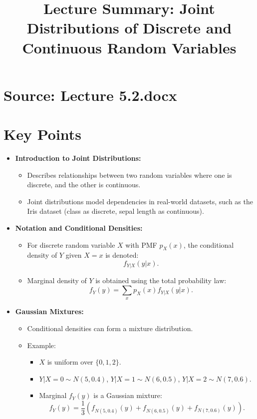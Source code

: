 \documentclass{article}
\title{Lecture Summary: Joint Distributions of Discrete and Continuous Random Variables}
\author{}
\date{}
\begin{document}
\maketitle

\section*{Source: Lecture 5.2.docx}

\section*{Key Points}

\begin{itemize}
  \item \textbf{Introduction to Joint Distributions:}
    \begin{itemize}
      \item Describes relationships between two random variables where one is discrete, and the other is continuous.
      \item Joint distributions model dependencies in real-world datasets, such as the Iris dataset (class as discrete, sepal length as continuous).
    \end{itemize}

  \item \textbf{Notation and Conditional Densities:}
    \begin{itemize}
      \item For discrete random variable $X$ with PMF $p_X(x)$, the conditional density of $Y$ given $X=x$ is denoted:
        \[
          f_{Y|X}(y|x).
        \]
      \item Marginal density of $Y$ is obtained using the total probability law:
        \[
          f_Y(y) = \sum_{x} p_X(x) f_{Y|X}(y|x).
        \]
    \end{itemize}

  \item \textbf{Gaussian Mixtures:}
    \begin{itemize}
      \item Conditional densities can form a mixture distribution.
      \item Example:
        \begin{itemize}
          \item $X$ is uniform over $\{0, 1, 2\}$.
          \item $Y|X=0 \sim N(5, 0.4)$, $Y|X=1 \sim N(6, 0.5)$, $Y|X=2 \sim N(7, 0.6)$.
          \item Marginal $f_Y(y)$ is a Gaussian mixture:
            \[
              f_Y(y) = \frac{1}{3}\left(f_{N(5,0.4)}(y) + f_{N(6,0.5)}(y) + f_{N(7,0.6)}(y)\right).
            \]
        \end{itemize}
    \end{itemize}


\end{itemize}
\end{document}

